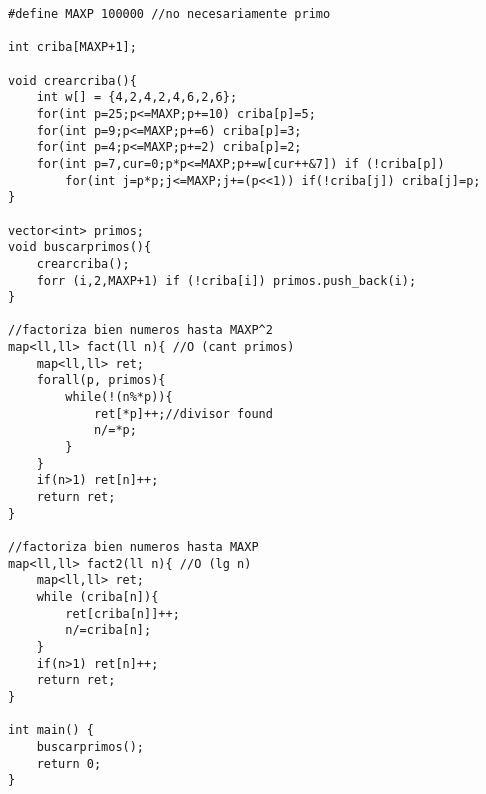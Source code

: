 \begin{verbatim}
#define MAXP 100000	//no necesariamente primo

int criba[MAXP+1];

void crearcriba(){
	int w[] = {4,2,4,2,4,6,2,6};
	for(int p=25;p<=MAXP;p+=10) criba[p]=5;
	for(int p=9;p<=MAXP;p+=6) criba[p]=3; 
	for(int p=4;p<=MAXP;p+=2) criba[p]=2;
	for(int p=7,cur=0;p*p<=MAXP;p+=w[cur++&7]) if (!criba[p]) 
		for(int j=p*p;j<=MAXP;j+=(p<<1)) if(!criba[j]) criba[j]=p;
}

vector<int> primos;
void buscarprimos(){
	crearcriba();
	forr (i,2,MAXP+1) if (!criba[i]) primos.push_back(i);
}

//factoriza bien numeros hasta MAXP^2
map<ll,ll> fact(ll n){ //O (cant primos)
	map<ll,ll> ret;
	forall(p, primos){
		while(!(n%*p)){
			ret[*p]++;//divisor found
			n/=*p;
		}
	}
	if(n>1) ret[n]++;
	return ret;
}

//factoriza bien numeros hasta MAXP
map<ll,ll> fact2(ll n){ //O (lg n)
	map<ll,ll> ret;
	while (criba[n]){
		ret[criba[n]]++;
		n/=criba[n];
	}
	if(n>1) ret[n]++;
	return ret;
}

int main() {
	buscarprimos();
	return 0;
}
\end{verbatim}
